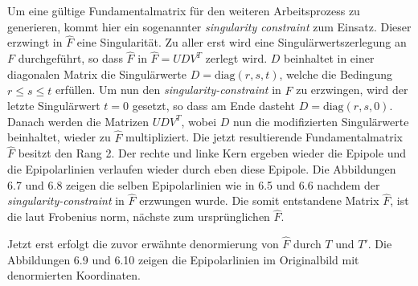 Um eine gültige Fundamentalmatrix für den weiteren Arbeitsprozess zu generieren, kommt hier ein sogenannter \textit{singularity constraint} zum Einsatz. Dieser erzwingt in $\hat{F}$ eine Singularität. Zu aller erst wird eine Singulärwertszerlegung an $F$ durchgeführt, so dass $\hat{F}$ in $\hat{F} = UDV^T$ zerlegt wird. $D$ beinhaltet in einer diagonalen Matrix die Singulärwerte $D = \text{diag}(r,s,t)$, welche die Bedingung $r \leq s \leq t $ erfüllen. Um nun den \textit{singularity-constraint} in $\hat{F}$ zu erzwingen, wird der letzte Singulärwert $t = 0$ gesetzt, so dass am Ende dasteht $D = \text{diag}(r,s,0)$. Danach werden die Matrizen $UDV^T$, wobei $D$ nun die modifizierten Singulärwerte beinhaltet, wieder zu $\hat{F}$ multipliziert. Die jetzt resultierende Fundamentalmatrix $\hat{F}$ besitzt den Rang 2. Der rechte und linke Kern ergeben wieder die Epipole und die Epipolarlinien verlaufen wieder durch eben diese Epipole. Die Abbildungen 6.7 und 6.8 zeigen die selben Epipolarlinien wie in 6.5 und 6.6 nachdem der \textit{singularity-constraint} in $\hat{F}$ erzwungen wurde. Die somit entstandene Matrix $\hat{F}$, ist die laut Frobenius norm, nächste zum ursprünglichen $\hat{F}$\cite{HZ}.

Jetzt erst erfolgt die zuvor erwähnte denormierung von $\hat{F}$ durch $T$ und $T'$. Die Abbildungen 6.9 und 6.10 zeigen die Epipolarlinien im Originalbild mit denormierten Koordinaten.



